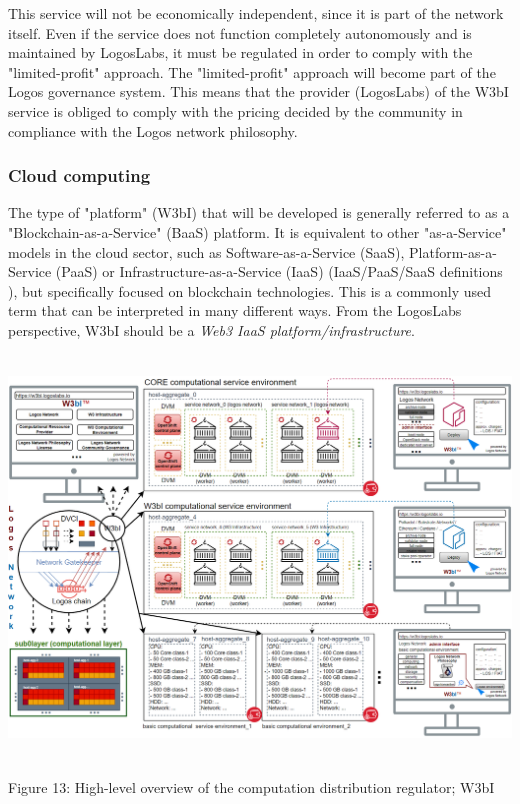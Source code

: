 \documentclass[]{article}
\begin{document}
This service will not be economically independent, since it is part of the network itself. 
Even if the service does not function completely autonomously and is maintained by LogosLabs, it must be regulated in order to comply with the "limited-profit" approach.
The "limited-profit" approach will become part of the Logos governance system.
This means that the provider (LogosLabs) of the W3bI service is obliged to comply with the pricing decided by the community in compliance with the Logos network philosophy.

\subsubsection{Cloud computing}
The type of "platform" (W3bI) that will be developed is generally referred to as a "Blockchain-as-a-Service" (BaaS) \cite{baas} platform. 
It is equivalent to other "as-a-Service" models in the cloud sector, such as Software-as-a-Service (SaaS), Platform-as-a-Service (PaaS) or Infrastructure-as-a-Service (IaaS) (IaaS/PaaS/SaaS definitions \cite{iaas-paas-saas}), but specifically focused on blockchain technologies.
This is a commonly used term that can be interpreted in many different ways.  
From the LogosLabs perspective, W3bI should be a \textit{Web3 IaaS platform/infrastructure}.

\begin{center}
	\includegraphics[height=10.7cm]{w3bi-overview}
\end{center}
\begin{center}
	Figure 13: High-level overview of the computation distribution regulator; W3bI
\end{center}
\end{document}

